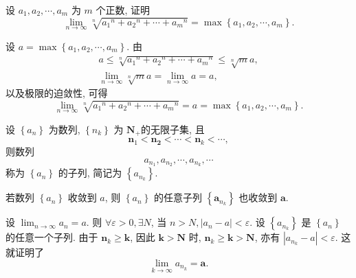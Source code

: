 \documentclass [t,12pt,mathserif] {beamer}
\begin{document}
\begin{frame}{}%
\begin{ex}
 设 $a_1, a_2, \cdots, a_m$ 为 $m$ 个正数, 证明
$$
\lim _{n \rightarrow \infty} \sqrt[n]{a_1{ }^n+a_2{ }^n+\cdots+a_m{ }^n}=\max \left\{a_1, a_2, \cdots, a_m\right\} .
$$
\end{ex}    
\zheng 设 $a=\max \left\{a_1, a_2, \cdots, a_m\right\}$. 由
$$
\begin{gathered}
a \leq \sqrt[n]{a_1{ }^n+a_2{ }^n+\cdots+a_m{ }^n} \leq \sqrt[n]{m} a, \\
\lim _{n \rightarrow \infty} \sqrt[n]{m} a=\lim _{n \rightarrow \infty} a=a,
\end{gathered}
$$
以及极限的迫敛性, 可得
$$
\lim _{n \rightarrow \infty} \sqrt[n]{a_1{ }^n+a_2{ }^n+\cdots+a_m{ }^n}=a=\max \left\{a_1, a_2, \cdots, a_m\right\} .
$$
\end{frame}

\begin{frame}{}%
\begin{dfn}
 设 $\left\{a_n\right\}$ 为数列, $\left\{n_k\right\}$ 为 $\mathbf{N}_{+}$的无限子集, 且
$$
\boldsymbol{n}_1<\boldsymbol{n}_{\mathbf{2}}<\cdots<\boldsymbol{n}_k<\cdots,
$$
则数列
$$
a_{n_1}, a_{n_2}, \cdots, a_{n_k}, \cdots
$$
称为 $\left\{a_n\right\}$ 的子列, 简记为 $\left\{a_{n_k}\right\}$.
\end{dfn}
  
\end{frame}

\begin{frame}{}%
 \begin{thm}
 若数列 $\left\{a_n\right\}$ 收敛到 $a$, 则 $\left\{a_n\right\}$ 的任意子列 $\left\{\boldsymbol{a}_{n_k}\right\}$ 也收敛到 $\boldsymbol{a}$.
 \end{thm}   
\zheng 设 $\lim _{n \rightarrow \infty} a_n=a$. 则 $\forall \varepsilon>0, \exists N$, 当 $n>N,\left|a_n-a\right|<\varepsilon$. 设 $\left\{a_{n_k}\right\}$ 是 $\left\{a_n\right\}$ 的任意一个子列. 由于 $\boldsymbol{n}_k \geq \boldsymbol{k}$, 因此 $\boldsymbol{k}>\boldsymbol{N}$ 时, $\boldsymbol{n}_k \geq \boldsymbol{k}>\boldsymbol{N}$, 亦有 $\left|a_{n_k}-a\right|<\varepsilon$. 这就证明了
$$
\lim _{k \rightarrow \infty} a_{n_k}=\boldsymbol{a} . 
$$
\end{frame}
\end{document}
